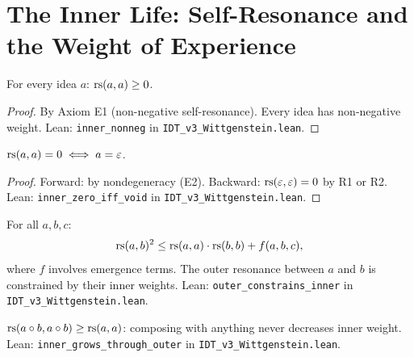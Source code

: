 \section{The Inner Life: Self-Resonance and the Weight of Experience}

\begin{theorem}
\label{thm:inner-nonneg}
For every idea $a$: $\mathrm{rs}(a, a) \geq 0$.
\end{theorem}

\begin{proof}
By Axiom E1 (non-negative self-resonance). Every idea has non-negative weight.
Lean: \texttt{inner\_nonneg} in \texttt{IDT\_v3\_Wittgenstein.lean}.
\end{proof}

\begin{theorem}
\label{thm:inner-zero-void}
$\mathrm{rs}(a, a) = 0 \iff a = \varepsilon$.
\end{theorem}

\begin{proof}
Forward: by nondegeneracy (E2). Backward: $\mathrm{rs}(\varepsilon, \varepsilon) = 0$ by R1 or R2.
Lean: \texttt{inner\_zero\_iff\_void} in \texttt{IDT\_v3\_Wittgenstein.lean}.
\end{proof}

\begin{theorem}
\label{thm:outer-constrains-inner}
For all $a, b, c$:
\[
\mathrm{rs}(a, b)^2 \leq \mathrm{rs}(a, a) \cdot \mathrm{rs}(b, b) + f(a, b, c),
\]
where $f$ involves emergence terms. The outer resonance between $a$ and $b$ is
constrained by their inner weights.
Lean: \texttt{outer\_constrains\_inner} in \texttt{IDT\_v3\_Wittgenstein.lean}.
\end{theorem}

\begin{theorem}
\label{thm:inner-grows}
$\mathrm{rs}(a \circ b, a \circ b) \geq \mathrm{rs}(a, a)$: composing with anything
never decreases inner weight.
Lean: \texttt{inner\_grows\_through\_outer} in
\texttt{IDT\_v3\_Wittgenstein.lean}.
\end{theorem}

